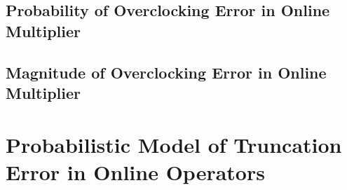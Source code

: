 \documentclass[a4paper, 11pt]{article}
\begin{document}

%
%


\subsection{Probability of Overclocking Error in Online Multiplier}

\subsection{Magnitude of Overclocking Error in Online Multiplier}

\section{Probabilistic Model of Truncation Error in Online Operators}
\end{document}
